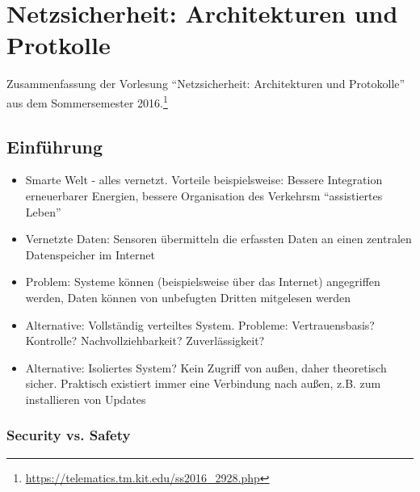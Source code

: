 \chapter{Netzsicherheit: Architekturen und Protkolle}

Zusammenfassung der Vorlesung "`Netzsicherheit: Architekturen und Protokolle"' aus dem Sommersemester 2016.\footnote{\url{https://telematics.tm.kit.edu/ss2016_2928.php}}

\section{Einführung}
\begin{itemize}
	\item Smarte Welt - alles vernetzt. Vorteile beispielsweise: Bessere Integration erneuerbarer Energien, bessere Organisation des Verkehrsm "`assistiertes Leben"'
	\item Vernetzte Daten: Sensoren übermitteln die erfassten Daten an einen zentralen Datenspeicher im Internet
	\item Problem: Systeme können (beispielsweise über das Internet) angegriffen werden, Daten können von unbefugten Dritten mitgelesen werden
	\item Alternative: Vollständig verteiltes System. Probleme: Vertrauensbasis? Kontrolle? Nachvollziehbarkeit? Zuverlässigkeit?
	\item Alternative: Isoliertes System? Kein Zugriff von außen, daher theoretisch sicher. Praktisch existiert immer eine Verbindung nach außen, z.B. zum installieren von Updates
\end{itemize}


\subsection{Security vs. Safety}

